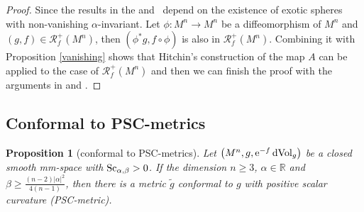 \documentclass[pdftex]{sigma}
\newtheorem{Proposition}[Theorem]{Proposition}
\begin{document}
\begin{proof}Since the results in the \cite[Section~4.4]{MR358873} and~\cite{MR3073935}
depend on the existence of exotic spheres with non-vanishing $\alpha$-invariant. Let $\phi\colon M^n\to M^n$ be a diffeomorphism of $M^n$ and $(g, f)\in \mathcal{R}^+_f(M^n)$, then $(\phi^*g, f\circ\phi)$ is also in $\mathcal{R}^+_f(M^n)$. Combining it with Proposition \ref{vanishing} shows that Hitchin's construction of the map $A$ \cite[Proposition~4.6]{MR358873} can be applied to the case of $\mathcal{R}^+_f(M^n)$ and then we can finish the proof with the arguments in \cite[Section~4.4]{MR358873} and \cite[Section~2.5]{MR3073935}.
\end{proof}

\subsection{Conformal to PSC-metrics}

\begin{Proposition}[conformal to PSC-metrics]\label{Conformal}
Let $\big(M^n, g, {\rm e}^{-f}\,{\rm dVol}_g\big)$ be a closed smooth mm-space with ${\rm Sc}_{\alpha, \beta} > 0$. If the dimension $n\geq 3$, $\alpha \in \mathbb{R}$ and $\beta \geq \frac{(n-2)|\alpha|^2}{4(n-1)}$, then there is a metric $\tilde{g}$ conformal to $g$ with positive scalar curvature (PSC-metric).
\end{Proposition}
\end{document}

